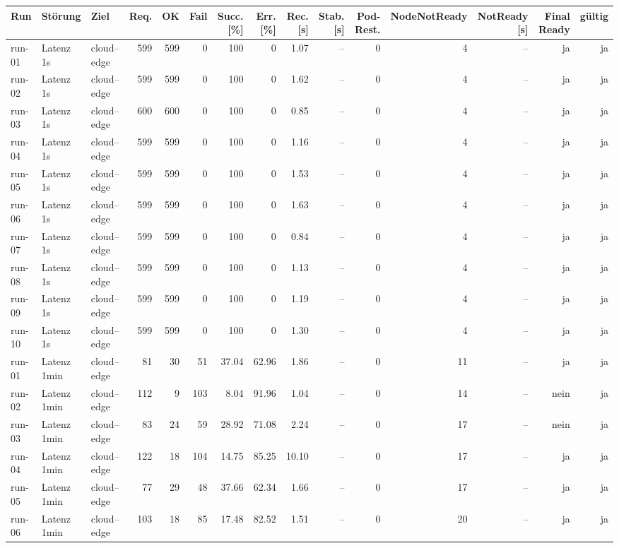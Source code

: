 \begin{table}
\centering
\scriptsize
\setlength{\tabcolsep}{3pt}
\renewcommand{\arraystretch}{1.08}
\begin{tabular}{l l p{3.2cm} r r r r r r r r r r r r}
\toprule
Run & Störung & Ziel & Req. & OK & Fail & Succ. [\%] & Err. [\%] & Rec. [s] & Stab. [s] & Pod-Rest. & NodeNotReady & NotReady [s] & Final Ready & gültig \\
\midrule
run-01 & Latenz 1s & cloud--edge & 599 & 599 & 0 & 100 & 0 & 1.07 & -- & 0 & 4 & -- & ja & ja \\
run-02 & Latenz 1s & cloud--edge & 599 & 599 & 0 & 100 & 0 & 1.62 & -- & 0 & 4 & -- & ja & ja \\
run-03 & Latenz 1s & cloud--edge & 600 & 600 & 0 & 100 & 0 & 0.85 & -- & 0 & 4 & -- & ja & ja \\
run-04 & Latenz 1s & cloud--edge & 599 & 599 & 0 & 100 & 0 & 1.16 & -- & 0 & 4 & -- & ja & ja \\
run-05 & Latenz 1s & cloud--edge & 599 & 599 & 0 & 100 & 0 & 1.53 & -- & 0 & 4 & -- & ja & ja \\
run-06 & Latenz 1s & cloud--edge & 599 & 599 & 0 & 100 & 0 & 1.63 & -- & 0 & 4 & -- & ja & ja \\
run-07 & Latenz 1s & cloud--edge & 599 & 599 & 0 & 100 & 0 & 0.84 & -- & 0 & 4 & -- & ja & ja \\
run-08 & Latenz 1s & cloud--edge & 599 & 599 & 0 & 100 & 0 & 1.13 & -- & 0 & 4 & -- & ja & ja \\
run-09 & Latenz 1s & cloud--edge & 599 & 599 & 0 & 100 & 0 & 1.19 & -- & 0 & 4 & -- & ja & ja \\
run-10 & Latenz 1s & cloud--edge & 599 & 599 & 0 & 100 & 0 & 1.30 & -- & 0 & 4 & -- & ja & ja \\
run-01 & Latenz 1min & cloud--edge & 81 & 30 & 51 & 37.04 & 62.96 & 1.86 & -- & 0 & 11 & -- & ja & ja \\
run-02 & Latenz 1min & cloud--edge & 112 & 9 & 103 & 8.04 & 91.96 & 1.04 & -- & 0 & 14 & -- & nein & ja \\
run-03 & Latenz 1min & cloud--edge & 83 & 24 & 59 & 28.92 & 71.08 & 2.24 & -- & 0 & 17 & -- & nein & ja \\
run-04 & Latenz 1min & cloud--edge & 122 & 18 & 104 & 14.75 & 85.25 & 10.10 & -- & 0 & 17 & -- & ja & ja \\
run-05 & Latenz 1min & cloud--edge & 77 & 29 & 48 & 37.66 & 62.34 & 1.66 & -- & 0 & 17 & -- & ja & ja \\
run-06 & Latenz 1min & cloud--edge & 103 & 18 & 85 & 17.48 & 82.52 & 1.51 & -- & 0 & 20 & -- & ja & ja \\

\end{tabular}
\end{table}
